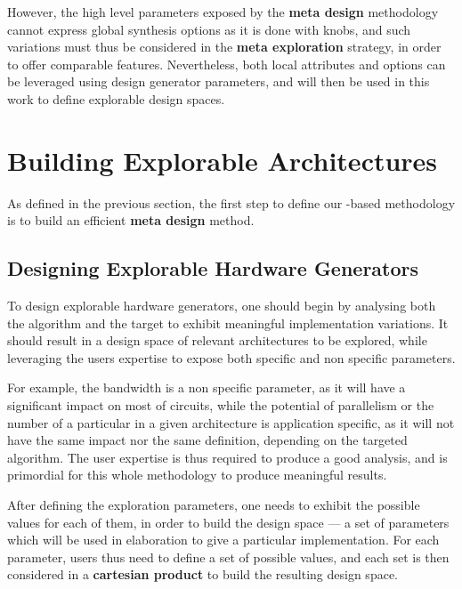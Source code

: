         However, the high level parameters exposed by the {\bf meta design} methodology cannot express global synthesis options as it is done with knobs, and such variations must thus be considered in the {\bf meta exploration} strategy, in order to offer comparable features.
        Nevertheless, both local attributes and  options can be leveraged using design generator parameters, and will then be used in this work to define explorable design spaces.


\section{Building Explorable Architectures}
\label{ch.dse:sec.explorable}
    As defined in the previous section, the first step to define our -based  methodology is to build an efficient {\bf meta design} method.

    \subsection{Designing Explorable Hardware Generators}
    \label{ch.dse:sec.explorable:ssec.generators}
        To design explorable hardware generators, one should begin by analysing both the algorithm and the target to exhibit meaningful implementation variations.
        It should result in a design space of relevant architectures to be explored, while leveraging the users expertise to expose both specific and non specific parameters.

        For example, the  bandwidth is a non specific parameter, as it will have a significant impact on most of circuits, while the potential of parallelism or the number of a particular  in a given architecture is application specific, as it will not have the same impact nor the same definition, depending on the targeted algorithm.
        The user expertise is thus required to produce a good analysis, and is primordial for this whole methodology to produce meaningful results.

        After defining the exploration parameters, one needs to exhibit the possible values for each of them, in order to build the design space --- \ie a set of parameters which will be used in elaboration to give a particular implementation.
        For each parameter, users thus need to define a set of possible values, and each set is then considered in a {\bf cartesian product} to build the resulting design space.

